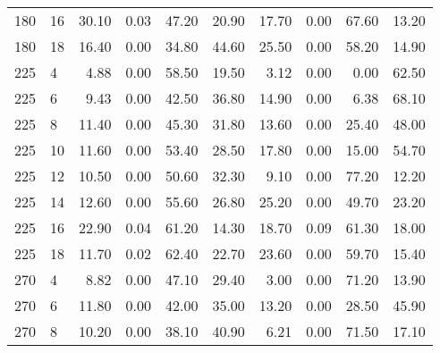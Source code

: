 \begin{table*}[h]
\begin{center}
\begin{tabular} {l l | r r r r | r r r r }
180  &             16  &  30.10  &            0.03             &               47.20  &  20.90  &  17.70  &            0.00             &               67.60  &  13.20  \\
180  &             18  &  16.40  &            0.00             &               34.80  &  44.60  &  25.50  &            0.00             &               58.20  &  14.90  \\
225  &             4   &  4.88   &            0.00             &               58.50  &  19.50  &  3.12   &            0.00             &               0.00   &  62.50  \\
225  &             6   &  9.43   &            0.00             &               42.50  &  36.80  &  14.90  &            0.00             &               6.38   &  68.10  \\
225  &             8   &  11.40  &            0.00             &               45.30  &  31.80  &  13.60  &            0.00             &               25.40  &  48.00  \\
225  &             10  &  11.60  &            0.00             &               53.40  &  28.50  &  17.80  &            0.00             &               15.00  &  54.70  \\
225  &             12  &  10.50  &            0.00             &               50.60  &  32.30  &  9.10   &            0.00             &               77.20  &  12.20  \\
225  &             14  &  12.60  &            0.00             &               55.60  &  26.80  &  25.20  &            0.00             &               49.70  &  23.20  \\
225  &             16  &  22.90  &            0.04             &               61.20  &  14.30  &  18.70  &            0.09             &               61.30  &  18.00  \\
225  &             18  &  11.70  &            0.02             &               62.40  &  22.70  &  23.60  &            0.00             &               59.70  &  15.40  \\
270  &             4   &  8.82   &            0.00             &               47.10  &  29.40  &  3.00   &            0.00             &               71.20  &  13.90  \\
270  &             6   &  11.80  &            0.00             &               42.00  &  35.00  &  13.20  &            0.00             &               28.50  &  45.90  \\
270  &             8   &  10.20  &            0.00             &               38.10  &  40.90  &  6.21   &            0.00             &               71.50  &  17.10  \\

\end{tabular}
\end{center}
\end{table*}
